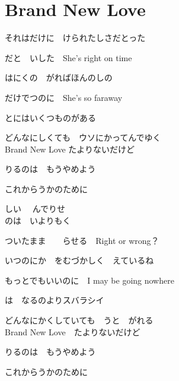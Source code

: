 \section{ Brand New Love}
\large{

それはだけに　けられたしさだとった

だと　いした　She's right on time

はにくの　がればほんのしの

だけでつのに　She's so faraway

とにはいくつものがある

どんなにしくても　ウソにかってんでゆく
\\

Brand New Love たよりないだけど

りるのは　もうやめよう

これからうかのために

しい　 んでりせ
\\

のは　いよりもく

ついたまま　　らせる　Right or wrong？

いつのにか　をむづかしく　えているね

もっとでもいいのに　I may be going nowhere

は　なるのよりスバラシイ

どんなにかくしていても　うと　がれる
\\

Brand New Love　たよりないだけど

りるのは　もうやめよう

これからうかのために

}
